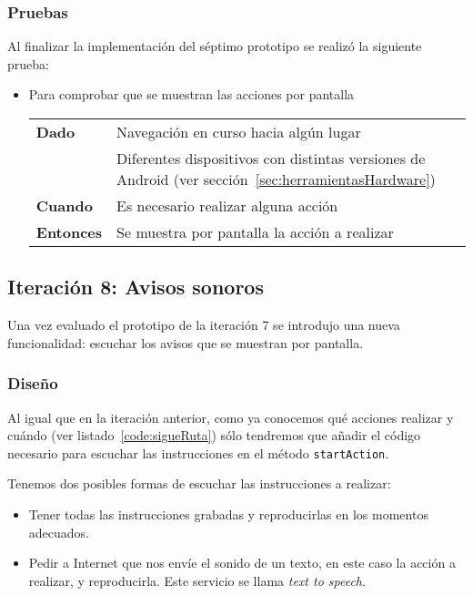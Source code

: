 \subsubsection{Pruebas}

Al finalizar la implementación del séptimo prototipo se realizó la siguiente prueba:

\begin{itemize}
  \item Para comprobar que se muestran las acciones por pantalla

  \begin{tabular}{p{}p{}}
    \hline
    \textbf{Dado}     & Navegación en curso hacia algún lugar \\
                      & Diferentes dispositivos con distintas versiones de Android (ver
                        sección~\ref{sec:herramientasHardware}) \\
    \textbf{Cuando}   & Es necesario realizar alguna acción \\
    \textbf{Entonces} & Se muestra por pantalla la acción a realizar \\
    \hline
  \end{tabular}
\end{itemize}

\subsection{Iteración 8: Avisos sonoros}

Una vez evaluado el prototipo de la iteración 7 se introdujo una nueva funcionalidad: escuchar los
avisos que se muestran por pantalla.

\subsubsection{Diseño}

Al igual que en la iteración anterior, como ya conocemos qué acciones realizar y cuándo (ver
listado~\ref{code:sigueRuta}) sólo tendremos que añadir el código necesario para escuchar las
instrucciones en el método \texttt{startAction}.

Tenemos dos posibles formas de escuchar las instrucciones a realizar:

\begin{itemize}
  \item Tener todas las instrucciones grabadas y reproducirlas en los momentos adecuados.
  \item Pedir a Internet que nos envíe el sonido de un texto, en este caso la acción a realizar, y
    reproducirla. Este servicio se llama \emph{text to speech}.
\end{itemize}

